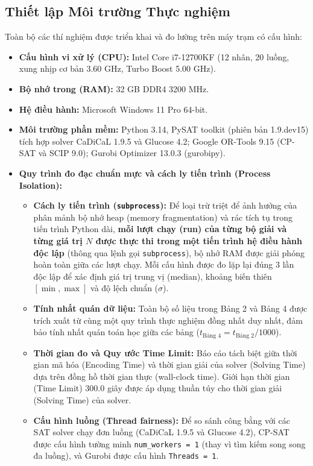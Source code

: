 \documentclass[a4paper,fleqn]{cas-sc}
\begin{document}
\subsection{Thiết lập Môi trường Thực nghiệm}
Toàn bộ các thí nghiệm được triển khai và đo lường trên máy trạm có cấu hình:
\begin{itemize}
    \item \textbf{Cấu hình vi xử lý (CPU):} Intel Core i7-12700KF (12 nhân, 20 luồng, xung nhịp cơ bản 3.60 GHz, Turbo Boost 5.00 GHz).
    \item \textbf{Bộ nhớ trong (RAM):} 32 GB DDR4 3200 MHz.
    \item \textbf{Hệ điều hành:} Microsoft Windows 11 Pro 64-bit.
    \item \textbf{Môi trường phần mềm:} Python 3.14, PySAT toolkit (phiên bản 1.9.dev15) tích hợp solver CaDiCaL 1.9.5 và Glucose 4.2; Google OR-Tools 9.15 (CP-SAT và SCIP 9.0); Gurobi Optimizer 13.0.3 (gurobipy).
    \item \textbf{Quy trình đo đạc chuẩn mực và cách ly tiến trình (Process Isolation):}
      \begin{itemize}
          \item \textbf{Cách ly tiến trình (\texttt{subprocess}):} Để loại trừ triệt để ảnh hưởng của phân mảnh bộ nhớ heap (memory fragmentation) và rác tích tụ trong tiến trình Python dài, \textbf{mỗi lượt chạy (run) của từng bộ giải và từng giá trị $N$ được thực thi trong một tiến trình hệ điều hành độc lập} (thông qua lệnh gọi \texttt{subprocess}), bộ nhớ RAM được giải phóng hoàn toàn giữa các lượt chạy. Mỗi cấu hình được đo lặp lại đúng 3 lần độc lập để xác định giá trị trung vị (median), khoảng biến thiên $[\min, \max]$ và độ lệch chuẩn ($\sigma$).
          \item \textbf{Tính nhất quán dữ liệu:} Toàn bộ số liệu trong Bảng 2 và Bảng 4 được trích xuất từ cùng một quy trình thực nghiệm đồng nhất duy nhất, đảm bảo tính nhất quán toán học giữa các bảng ($t_{\text{Bảng 4}} = t_{\text{Bảng 2}} / 1000$).
          \item \textbf{Thời gian đo và Quy ước Time Limit:} Báo cáo tách biệt giữa thời gian mã hóa (Encoding Time) và thời gian giải của solver (Solving Time) dựa trên đồng hồ thời gian thực (wall-clock time). Giới hạn thời gian (Time Limit) 300.0 giây được áp dụng thuần túy cho thời gian giải (Solving Time) của solver.
          \item \textbf{Cấu hình luồng (Thread fairness):} Để so sánh công bằng với các SAT solver chạy đơn luồng (CaDiCaL 1.9.5 và Glucose 4.2), CP-SAT được cấu hình tường minh \texttt{num\_workers = 1} (thay vì tìm kiếm song song đa luồng), và Gurobi được cấu hình \texttt{Threads = 1}.

\end{itemize}
\end{itemize}
\end{document}
